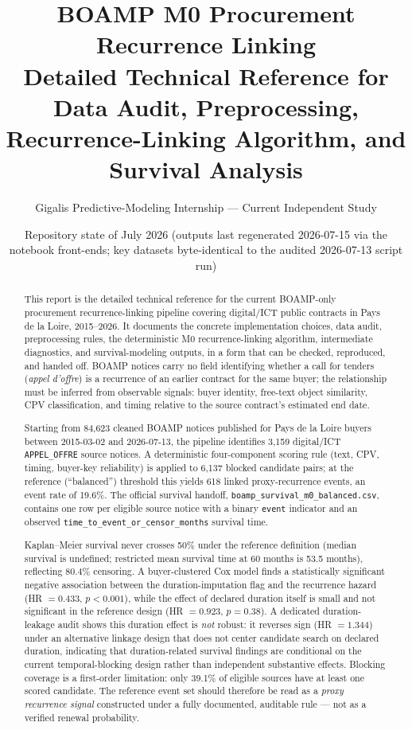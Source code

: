 \documentclass[11pt]{article}
\title{BOAMP M0 Procurement Recurrence Linking\\
\large Detailed Technical Reference for Data Audit, Preprocessing, Recurrence-Linking
Algorithm, and Survival Analysis}
\author{Gigalis Predictive-Modeling Internship --- Current Independent Study}
\date{Repository state of July 2026 (outputs last regenerated 2026-07-15 via the
notebook front-ends; key datasets byte-identical to the audited 2026-07-13
script run)}
\begin{document}
\maketitle

\begin{abstract}
This report is the detailed technical reference for the current BOAMP-only
procurement recurrence-linking pipeline covering digital/ICT public
contracts in Pays de la Loire, 2015--2026. It documents the concrete
implementation choices, data audit, preprocessing rules, the deterministic
M0 recurrence-linking algorithm, intermediate diagnostics, and
survival-modeling outputs, in a form that can be checked, reproduced, and
handed off. BOAMP notices carry no field identifying whether a call for
tenders (\emph{appel d'offre}) is a recurrence of an earlier contract for the
same buyer; the relationship must be inferred from observable signals:
buyer identity, free-text object similarity, CPV classification, and timing
relative to the source contract's estimated end date.

Starting from 84{,}623 cleaned BOAMP notices published for Pays de la Loire
buyers between 2015-03-02 and 2026-07-13, the pipeline identifies 3{,}159
digital/ICT \texttt{APPEL\_OFFRE} source notices. A deterministic
four-component scoring rule (text, CPV, timing, buyer-key reliability) is
applied to 6{,}137 blocked candidate pairs; at the reference (``balanced'')
threshold this yields 618 linked proxy-recurrence events, an event rate of
19.6\%. The official survival handoff,
\texttt{boamp\_survival\_m0\_balanced.csv}, contains one row per eligible
source notice with a binary \texttt{event} indicator and an observed
\texttt{time\_to\_event\_or\_censor\_months} survival time.

Kaplan--Meier survival never crosses 50\% under the reference definition
(median survival is undefined; restricted mean survival time at 60 months is
53.5 months), reflecting 80.4\% censoring. A buyer-clustered Cox model finds
a statistically significant negative association between the duration-imputation
flag and the recurrence hazard (HR $=0.433$, $p<0.001$), while the effect of
declared duration itself is small and not significant in the reference
design (HR $=0.923$, $p=0.38$). A dedicated duration-leakage audit shows
this duration effect is \emph{not} robust: it reverses sign (HR $=1.344$)
under an alternative linkage design that does not center candidate search on
declared duration, indicating that duration-related survival findings are
conditional on the current temporal-blocking design rather than independent
substantive effects. Blocking coverage is a first-order limitation: only
39.1\% of eligible sources have at least one scored candidate. The reference
event set should therefore be read as a \emph{proxy recurrence signal}
constructed under a fully documented, auditable rule --- not as a verified
renewal probability.
\end{abstract}
\end{document}
